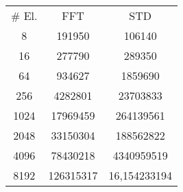 \begin{center}
    \begin{tabular}{|c| c c|}
        \# El. & FFT & STD\\
        8      & 191950 & 106140 \\
        16     & 277790 & 289350 \\
        64     & 934627 & 1859690 \\
        256    & 4282801 & 23703833 \\
        1024   & 17969459 & 264139561 \\
        2048   & 33150304 & 188562822 \\
        4096   & 78430218 & 4340959519 \\
        8192   & 126315317 & 16,154233194 \\
    \end{tabular}
\end{center}








